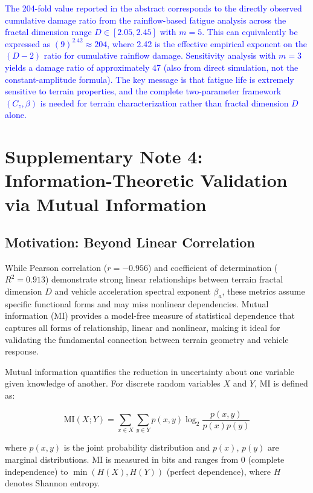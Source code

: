 \documentclass[11pt]{article}
\begin{document}
\textcolor{blue}{The 204-fold value reported in the abstract corresponds to the directly observed cumulative damage ratio from the rainflow-based fatigue analysis across the fractal dimension range $D \in [2.05, 2.45]$ with $m = 5$. This can equivalently be expressed as $(9)^{2.42} \approx 204$, where 2.42 is the effective empirical exponent on the $(D-2)$ ratio for cumulative rainflow damage. Sensitivity analysis with $m = 3$ yields a damage ratio of approximately 47 (also from direct simulation, not the constant-amplitude formula). The key message is that fatigue life is extremely sensitive to terrain properties, and the complete two-parameter framework $(C_z, \beta)$ is needed for terrain characterization rather than fractal dimension $D$ alone.}

\section{Supplementary Note 4: Information-Theoretic Validation via Mutual Information}

\subsection{Motivation: Beyond Linear Correlation}

While Pearson correlation ($r = -0.956$) and coefficient of determination ($R^2 = 0.913$) demonstrate strong linear relationships between terrain fractal dimension $D$ and vehicle acceleration spectral exponent $\beta_a$, these metrics assume specific functional forms and may miss nonlinear dependencies. Mutual information (MI) provides a model-free measure of statistical dependence that captures all forms of relationship, linear and nonlinear, making it ideal for validating the fundamental connection between terrain geometry and vehicle response\cite{Cover2006}.

Mutual information quantifies the reduction in uncertainty about one variable given knowledge of another. For discrete random variables $X$ and $Y$, MI is defined as:

\begin{equation}
\text{MI}(X;Y) = \sum_{x \in X} \sum_{y \in Y} p(x,y) \log_2 \frac{p(x,y)}{p(x)p(y)}
\end{equation}

where $p(x,y)$ is the joint probability distribution and $p(x)$, $p(y)$ are marginal distributions. MI is measured in bits and ranges from 0 (complete independence) to $\min(H(X), H(Y))$ (perfect dependence), where $H$ denotes Shannon entropy.
\end{document}
